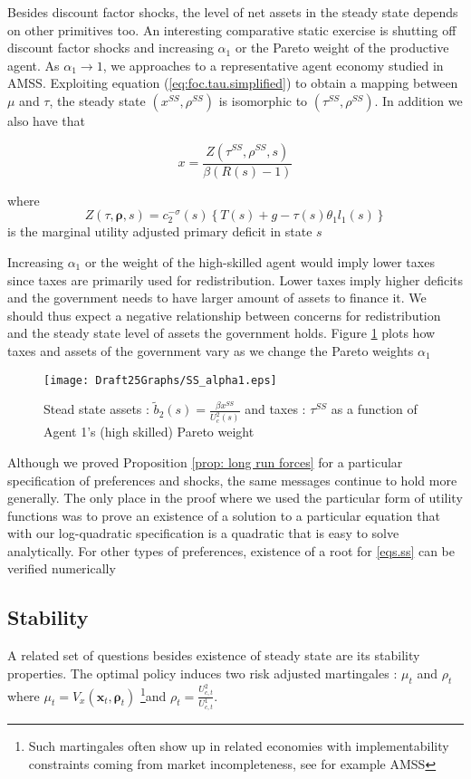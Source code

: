 \documentclass[thmsb,11pt]{article}
\begin{document}
Besides discount factor shocks, the level of net assets in the steady state depends on other primitives too. An interesting comparative static exercise is shutting off discount factor shocks and increasing $\alpha_1$ or the Pareto weight of the productive agent. As $\alpha_1 \to 1$, we approaches to a representative agent economy studied in AMSS.  Exploiting equation (\ref{eq:foc.tau.simplified}) to obtain a mapping between $\mu$ and $\tau$,  the steady state $(x^{SS},\rho^{SS})$ is  isomorphic to $(\tau^{SS},\rho^{SS})$.  In addition we also have that

\[	x=\frac{Z(\tau^{SS},\rho^{SS},s)}{\beta(R(s)-1)}\]

where \[Z(\tau, \bm \rho,s)=c_2^{-\sigma}(s)\left\{T(s)+g-\tau(s)\theta_1l_1(s)\right\}\]  is the marginal utility adjusted primary deficit in state $s$

Increasing  $\alpha_1$ or the weight of the high-skilled agent would imply lower taxes since taxes are primarily used for redistribution. Lower taxes imply higher deficits and the government needs to have larger amount of assets to finance it. We should thus expect a negative relationship between concerns for redistribution and the steady state level of assets the government holds. Figure \ref{fig: SS comparative} plots how taxes and assets of the government vary as we change the Pareto weights $\alpha_1$

  \begin{figure}[htp]
 \centering
 \texttt{[image: Draft25Graphs/SS\_alpha1.eps]}
 \caption{ Stead state assets : $\tilde{b}_2(s)=\frac{\beta  x^{SS}}{U^2_c(s)}$ and taxes : $\tau^{SS}$ as a function of Agent 1's (high skilled) Pareto weight}
 \label{fig: SS comparative}
 \end{figure}


Although we proved Proposition \ref{prop: long run forces} for a particular
specification of preferences and shocks, the same  messages continue to hold more
generally.  The only place in the proof where we used the particular form of utility functions  was to prove an existence of a
solution to a particular equation that with our log-quadratic specification is  a quadratic that is
easy to solve analytically.  For other types of preferences, existence of a root for \ref{eqs.ss} 
can be verified numerically 

\subsection{Stability}
A related set of questions besides existence of steady state are its stability properties. The optimal policy induces two risk adjusted martingales : $\mu_{t}$ and $\rho_{t}$ where $\mu_{t}=V_{x}(\bm x_t,\bm {\rho}_t)$ \footnote{Such martingales often show up in related economies with implementability constraints coming from market incompleteness, see for example AMSS }and $\rho_t=\frac{U^2_{c,t}}{U^1_{c,t}}$. 
\end{document}
